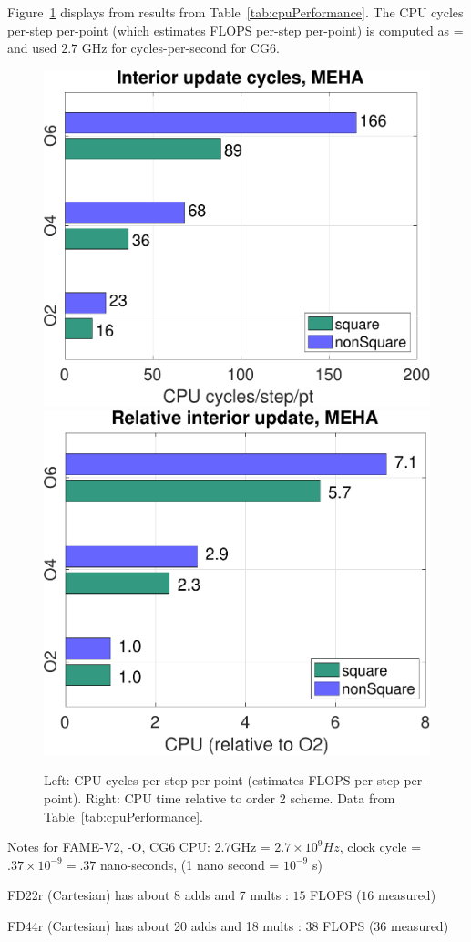 \mni
Figure~\ref{fig:relativeSolveTimes} displays from results from Table~\ref{tab:cpuPerformance}.
The CPU cycles per-step per-point (which estimates FLOPS per-step per-point) is computed
as
\ba
   =  \times {}
\ea
and used  $2.7$ GHz for cycles-per-second for CG6. 
\begin{figure}[hbt]
\begin{center}
  \includegraphics[width=.45\linewidth]{fig/cyclesAdvanceTimesHorizontalBarssquare}
  \quad
  \includegraphics[width=.45\linewidth]{fig/relativeAdvanceTimesHorizontalBarssquare}
  \end{center} 
\caption{Left: CPU cycles per-step per-point (estimates FLOPS per-step per-point). Right: CPU time relative to order 2 scheme.
  Data from Table~\ref{tab:cpuPerformance}.}
\label{fig:relativeSolveTimes}
\end{figure}

\bigskip
Notes for FAME-V2, -O,
\mni
CG6 CPU: 2.7GHz = $2.7\times 10^9 Hz$, clock cycle = $.37\times 10^{-9} = .37$ nano-seconds, (1 nano second = $10^{-9}$ s) 

\mni
FD22r (Cartesian) has about 8 adds and 7 mults : $15$ FLOPS ($16$ measured)

\mni
FD44r (Cartesian) has about 20 adds and 18 mults : $38$ FLOPS ($36$ measured)


